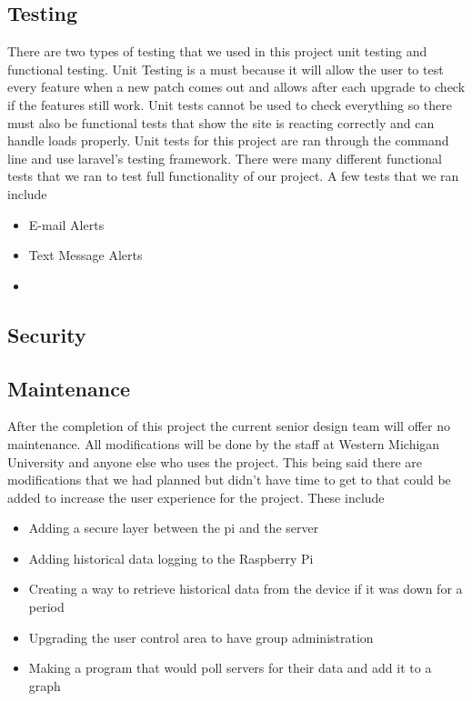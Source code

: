 \documentclass{report}
\begin{document}
\subsection*{Testing}
There are two types of testing that we used in this project unit testing and functional testing. Unit Testing is a must because it will allow the user to test every feature when a new patch comes out and allows after each upgrade to check if the features still work. Unit tests cannot be used to check everything so there must also be functional tests that show the site is reacting correctly and can handle loads properly.
\newline
\indent
Unit tests for this project are ran through the command line and use laravel's testing framework. 
\newline
\indent
There were many different functional tests that we ran to test full functionality of our project. A few tests that we ran include
\begin {itemize}
\item E-mail Alerts
\item Text Message Alerts
\item 
\end {itemize}

\newpage
\subsection*{Security}
\newpage

\subsection*{Maintenance}
\newpage
After the completion of this project the current senior design team will offer no maintenance. All modifications will be done by the staff at Western Michigan University and anyone else who uses the project. This being said there are modifications that we had planned but didn't have time to get to that could be added to increase the user experience for the project. These include
\begin {itemize}
\item Adding a secure layer between the pi and the server
\item Adding historical data logging to the Raspberry Pi
\item Creating a way to retrieve historical data from the device if it was down for a period
\item Upgrading the user control area to have group administration
\item Making a program that would poll servers for their data and add it to a graph
\end {itemize}
\end{document}
